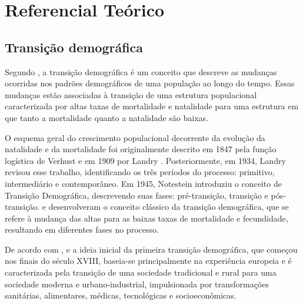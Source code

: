 \chapter[Referencial Teórico]{Referencial Teórico}

\section{Transição demográfica}
Segundo , a transição demográfica é um conceito que descreve as mudanças ocorridas nos padrões demográficos de uma população ao longo do tempo. Essas mudanças estão associadas à transição de uma estrutura populacional caracterizada por altas taxas de mortalidade e natalidade para uma estrutura em que tanto a mortalidade quanto a natalidade são baixas.


O esquema geral do crescimento populacional decorrente da evolução da natalidade e da mortalidade foi originalmente descrito em 1847 pela função logística de Verhust e em 1909 por Landry \cite{patarra1986}. Posteriormente, em 1934, Landry revisou esse trabalho, identificando os três períodos do processo: primitivo, intermediário e contemporâneo. Em 1945, Notestein introduziu o conceito de Transição Demográfica, descrevendo suas fases: pré-transição, transição e pós-transição.  e  desenvolveram o conceito clássico da transição demográfica, que se refere à mudança das altas para as baixas taxas de mortalidade e fecundidade, resultando em diferentes fases no processo.


De acordo com ,  e  a ideia inicial da primeira transição demográfica, que começou nos finais do século XVIII, baseia-se principalmente na experiência europeia e é caracterizada pela transição de uma sociedade tradicional e rural para uma sociedade moderna e urbano-industrial, impulsionada por transformações sanitárias, alimentares, médicas, tecnológicas e socioeconômicas.

